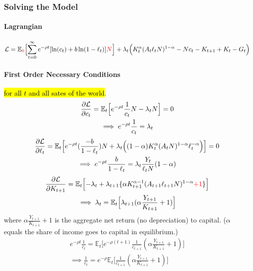 \documentclass[11pt]{article}
\newcommand{\expat}[2]{\mathbb{E}_{#1}\Big[{#2}\Big]}
\begin{document}
		\subsubsection{Solving the Model}
			\paragraph{Lagrangian}
			\begin{equation}
				\mc{L} = \expat{\textcolor{red}{0}}{\sum_{t=0}^\infty e^{-\rho t} [\ln(c_t) + b \ln(1-\ell_t)]\textcolor{red}{N}} + \lambda_t \Big (K_t^\alpha (A_t \ell_t N)^{1-\alpha} - Nc_t - K_{t+1} + K_t - G_t \Big )
			\end{equation}
			
			\paragraph{First Order Necessary Conditions}\hl{for all $t$ and all sates of the world}.
			\begin{gather}
				\pd{\mc{L}}{c_t} = \expat{t}{e^{-\rho t} \frac{1}{c_t}N - \lambda_t N} = 0 \\
				\implies e^{-\rho t} \frac{1}{c_t} = \lambda_t
			\end{gather}
			\begin{gather}
				\pd{\mc{L}}{\ell_t} = \expat{t}{e^{-\rho t} (\frac{-b}{1-\ell_t})N + \lambda_t \Big( (1-\alpha)K_t^\alpha (A_t N)^{1-\alpha} \ell_t ^ {-\alpha}\Big)} = 0 \\
				\implies e^{-\rho t} \frac{b}{1-\ell_t} = \lambda_t \frac{Y_t}{\ell_t N} (1-\alpha)
			\end{gather}
			\begin{gather}
				\pd{\mc{L}}{K_{t+1}} = \expat{t}{-\lambda_t + \lambda_{t+1}\{\alpha K_{t+1}^{\alpha-1}(A_{t+1} \ell_{t+1} N)^{1-\alpha} \textcolor{red}{+ 1}\}} \\
				\implies \lambda_t = \expat{t}{\lambda_{t+1} (\alpha \frac{Y_{t+1}}{K_{t+1}} + 1)}
			\end{gather}
			where $\alpha \frac{Y_{t+1}}{K_{t+1}} + 1$ is the aggregate net return (no depreciation) to capital. ($\alpha$ equals the share of income goes to capital in equilibrium.) \\
			\begin{gather}
				e^{-\rho t} \frac{1}{c_t} = \expat{t}{e^{-\rho(t+1)} \frac{1}{c_{t+1}} (\alpha \frac{Y_{t+1}}{K_{t+1}} + 1)} \\
				\implies \frac{1}{c_t} = e^{-\rho}\expat{t}{\frac{1}{c_{t+1}} (\alpha \frac{Y_{t+1}}{K_{t+1}} + 1)}
			\end{gather}
\end{document}
